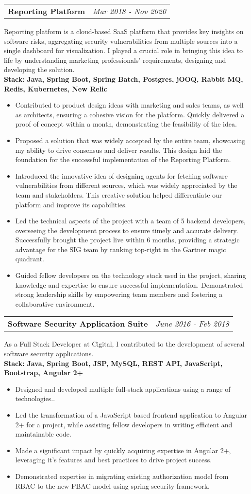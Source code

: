 \documentclass[14pt,a4paper,sans]{moderncv}
\newcommand{\project}[5]{
    \noindent
    \begin{tabularx}{\textwidth}{Xr}
    \textbf{#1} & \textit{#2} \\
    \end{tabularx}
    #3 \\ %
    \noindent\textbf{Stack:} \textbf{#4} %
    \begin{itemize}[label=\textbullet, left=1em] %
    #5 %
    \end{itemize}
    \vspace{1em} %
}
\begin{document}
    \project{Reporting Platform}{Mar 2018 ‐ Nov 2020}
    {Reporting platform is a cloud-based SaaS platform that provides key insights on software risks, aggregating security vulnerabilities from multiple sources into a single dashboard for visualization. I played a crucial role in bringing this idea to life by understanding marketing professionals' requirements, designing and developing the solution.}
    {Java, Spring Boot, Spring Batch, Postgres, jOOQ, Rabbit MQ, Redis, Kubernetes, New Relic}
    {
        \item Contributed to product design ideas with marketing and sales teams, as well as architects, ensuring a cohesive vision for the platform. Quickly delivered a proof of concept within a month, demonstrating the feasibility of the idea.
        \item Proposed a solution that was widely accepted by the entire team, showcasing my ability to drive consensus and deliver results. This design laid the foundation for the successful implementation of the Reporting Platform.
        \item Introduced the innovative idea of designing agents for fetching software vulnerabilities from different sources, which was widely appreciated by the team and stakeholders. This creative solution helped differentiate our platform and improve its capabilities.
        \item Led the technical aspects of the project with a team of 5 backend developers, overseeing the development process to ensure timely and accurate delivery. Successfully brought the project live within 6 months, providing a strategic advantage for the SIG team by ranking top-right in the Gartner magic quadrant.
        \item Guided fellow developers on the technology stack used in the project, sharing knowledge and expertise to ensure successful implementation. Demonstrated strong leadership skills by empowering team members and fostering a collaborative environment.
    }

    \project{Software Security Application Suite}{June 2016 ‐ Feb 2018}
    {As a Full Stack Developer at Cigital, I contributed to the development of several software security applications.}
    {Java, Spring Boot, JSP, MySQL, REST API, JavaScript, Bootstrap, Angular 2+}
    {
        \item Designed and developed multiple full-stack applications using a range of technologies..
        \item Led the transformation of a JavaScript based frontend application to Angular 2+ for a project, while assisting fellow developers in writing efficient and maintainable code.
        \item Made a significant impact by quickly acquiring expertise in Angular 2+, leveraging it's features and best practices to drive project success.
        \item Demonstrated expertise in migrating existing authorization model from RBAC to the new PBAC model using spring security framework.
    }
\end{document}
